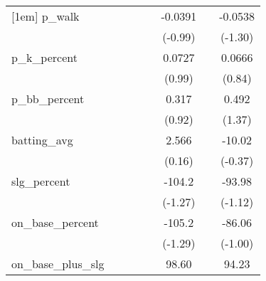 {\begin{tabular}{l*{7}{c}}
[1em]
p\_walk      &                     &                     &                     &                     &     -0.0391         &                     &     -0.0538         \\
            &                     &                     &                     &                     &     (-0.99)         &                     &     (-1.30)         \\
[1em]
p\_k\_percent &                     &                     &                     &                     &      0.0727         &                     &      0.0666         \\
            &                     &                     &                     &                     &      (0.99)         &                     &      (0.84)         \\
[1em]
p\_bb\_percent&                     &                     &                     &                     &       0.317         &                     &       0.492         \\
            &                     &                     &                     &                     &      (0.92)         &                     &      (1.37)         \\
[1em]
batting\_avg &                     &                     &                     &                     &       2.566         &                     &      -10.02         \\
            &                     &                     &                     &                     &      (0.16)         &                     &     (-0.37)         \\
[1em]
slg\_percent &                     &                     &                     &                     &      -104.2         &                     &      -93.98         \\
            &                     &                     &                     &                     &     (-1.27)         &                     &     (-1.12)         \\
[1em]
on\_base\_percent&                     &                     &                     &                     &      -105.2         &                     &      -86.06         \\
            &                     &                     &                     &                     &     (-1.29)         &                     &     (-1.00)         \\
[1em]
on\_base\_plus\_slg&                     &                     &                     &                     &       98.60         &                     &       94.23         \\

\end{tabular}}
